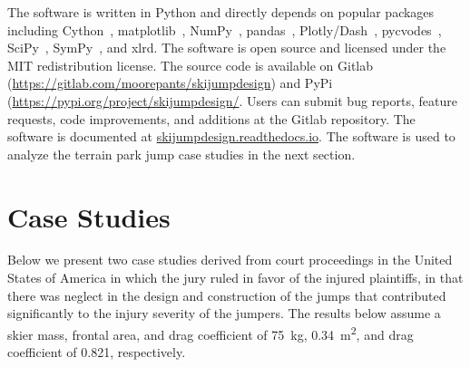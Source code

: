 \documentclass{article}
\begin{document}
The software is written in Python and directly depends on popular packages
including Cython~\cite{Behnel2011}, matplotlib~\cite{Hunter2007},
NumPy~\cite{Oliphant2006}, pandas~\cite{McKinney2020},
Plotly/Dash~\cite{Plotly2015}, pycvodes~\cite{Dahlgren2018},
SciPy~\cite{Virtanen2020}, SymPy~\cite{Meurer2017}, and xlrd.
The software is open source and licensed under the MIT redistribution license.
The source code is available on Gitlab
(\url{https://gitlab.com/moorepants/skijumpdesign}) and PyPi
(\url{https://pypi.org/project/skijumpdesign/}. Users can submit bug reports, feature
requests, code improvements, and additions at the Gitlab repository. The
software is documented at
\href{https://skijumpdesign.readthedocs.io}{skijumpdesign.readthedocs.io}. The
software is used to analyze the terrain park jump case studies in the next
section.

\section{Case Studies}
%
Below we present two case studies derived from court proceedings in the United
States of America in which the jury ruled in favor of the injured plaintiffs,
in that there was neglect in the design and construction of the jumps that
contributed significantly to the injury severity of the jumpers. The results
below assume a skier mass, frontal area, and drag coefficient of 75~\si{\kg},
0.34~\si{\meter\squared}, and drag coefficient of 0.821, respectively.
\end{document}

